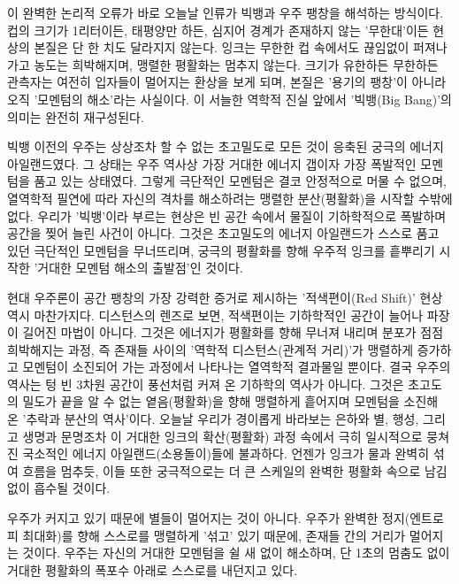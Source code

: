 이 완벽한 논리적 오류가 바로 오늘날 인류가 빅뱅과 우주 팽창을 해석하는 방식이다. 컵의 크기가 1리터이든, 태평양만 하든, 심지어 경계가 존재하지 않는 '무한대'이든 현상의 본질은 단 한 치도 달라지지 않는다. 잉크는 무한한 컵 속에서도 끊임없이 퍼져나가고 농도는 희박해지며, 맹렬한 평활화는 멈추지 않는다. 크기가 유한하든 무한하든 관측자는 여전히 입자들이 멀어지는 환상을 보게 되며, 본질은 '용기의 팽창'이 아니라 오직 '모멘텀의 해소'라는 사실이다.
이 서늘한 역학적 진실 앞에서 '빅뱅(Big Bang)'의 의미는 완전히 재구성된다. 

빅뱅 이전의 우주는 상상조차 할 수 없는 초고밀도로 모든 것이 응축된 궁극의 에너지 아일랜드였다. 그 상태는 우주 역사상 가장 거대한 에너지 갭이자 가장 폭발적인 모멘텀을 품고 있는 상태였다. 그렇게 극단적인 모멘텀은 결코 안정적으로 머물 수 없으며, 열역학적 필연에 따라 자신의 격차를 해소하려는 맹렬한 분산(평활화)을 시작할 수밖에 없다.
우리가 '빅뱅'이라 부르는 현상은 빈 공간 속에서 물질이 기하학적으로 폭발하며 공간을 찢어 늘린 사건이 아니다. 그것은 초고밀도의 에너지 아일랜드가 스스로 품고 있던 극단적인 모멘텀을 무너뜨리며, 궁극의 평활화를 향해 우주적 잉크를 흩뿌리기 시작한 '거대한 모멘텀 해소의 출발점'인 것이다.

현대 우주론이 공간 팽창의 가장 강력한 증거로 제시하는 '적색편이(Red Shift)' 현상 역시 마찬가지다. 디스턴스의 렌즈로 보면, 적색편이는 기하학적인 공간이 늘어나 파장이 길어진 마법이 아니다. 그것은 에너지가 평활화를 향해 무너져 내리며 분포가 점점 희박해지는 과정, 즉 존재들 사이의 '역학적 디스턴스(관계적 거리)'가 맹렬하게 증가하고 모멘텀이 소진되어 가는 과정에서 나타나는 열역학적 결과물일 뿐이다.
결국 우주의 역사는 텅 빈 3차원 공간이 풍선처럼 커져 온 기하학의 역사가 아니다. 그것은 초고도의 밀도가 끝을 알 수 없는 옅음(평활화)을 향해 맹렬하게 흩어지며 모멘텀을 소진해 온 '추락과 분산의 역사'이다. 오늘날 우리가 경이롭게 바라보는 은하와 별, 행성, 그리고 생명과 문명조차 이 거대한 잉크의 확산(평활화) 과정 속에서 극히 일시적으로 뭉쳐진 국소적인 에너지 아일랜드(소용돌이)들에 불과하다. 언젠가 잉크가 물과 완벽히 섞여 흐름을 멈추듯, 이들 또한 궁극적으로는 더 큰 스케일의 완벽한 평활화 속으로 남김없이 흡수될 것이다.

우주가 커지고 있기 때문에 별들이 멀어지는 것이 아니다. 우주가 완벽한 정지(엔트로피 최대화)를 향해 스스로를 맹렬하게 '섞고' 있기 때문에, 존재들 간의 거리가 멀어지는 것이다. 우주는 자신의 거대한 모멘텀을 쉴 새 없이 해소하며, 단 1초의 멈춤도 없이 거대한 평활화의 폭포수 아래로 스스로를 내던지고 있다.
